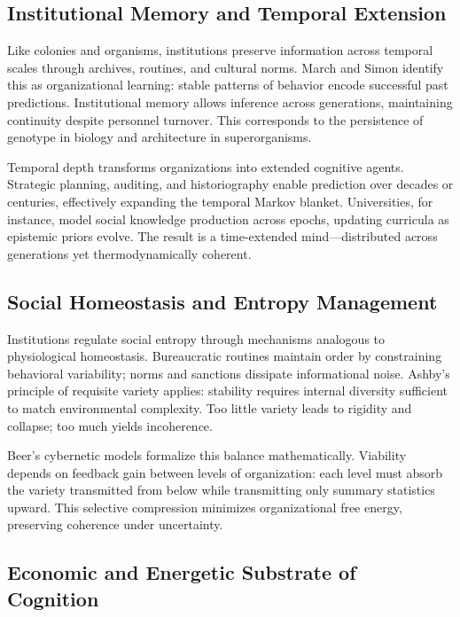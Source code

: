 \documentclass[11pt,a4paper]{article}
\begin{document}
\subsection{Institutional Memory and Temporal Extension}

Like colonies and organisms, institutions preserve information across temporal scales through archives, routines, and cultural norms.  March and Simon \citep{MarchSimon1958Organizations} identify this as organizational learning: stable patterns of behavior encode successful past predictions.  Institutional memory allows inference across generations, maintaining continuity despite personnel turnover.  This corresponds to the persistence of genotype in biology and architecture in superorganisms.

Temporal depth transforms organizations into extended cognitive agents.  Strategic planning, auditing, and historiography enable prediction over decades or centuries, effectively expanding the temporal Markov blanket.  Universities, for instance, model social knowledge production across epochs, updating curricula as epistemic priors evolve.  The result is a time-extended mind—distributed across generations yet thermodynamically coherent.

\subsection{Social Homeostasis and Entropy Management}

Institutions regulate social entropy through mechanisms analogous to physiological homeostasis.  Bureaucratic routines maintain order by constraining behavioral variability; norms and sanctions dissipate informational noise.  Ashby’s principle of requisite variety \citep{Ashby1956DesignBrain} applies: stability requires internal diversity sufficient to match environmental complexity.  Too little variety leads to rigidity and collapse; too much yields incoherence.

Beer’s cybernetic models \citep{Beer1979BrainOfFirm} formalize this balance mathematically.  Viability depends on feedback gain between levels of organization: each level must absorb the variety transmitted from below while transmitting only summary statistics upward.  This selective compression minimizes organizational free energy, preserving coherence under uncertainty.

\subsection{Economic and Energetic Substrate of Cognition}
\end{document}
